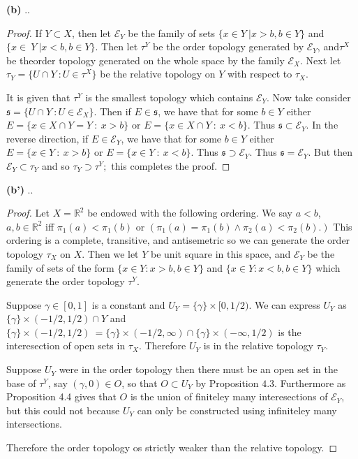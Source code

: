 \documentclass[11pt]{amsart}
\theoremstyle{definition}
\numberwithin{theorem}{section}
\numberwithin{definition}{section}
\numberwithin{equation}{section}
\def\reals{{\mathbb R}}
\def\scripte{{\mathcal E}}
\begin{document}
\noindent \textbf{(b)} ..
\begin{proof}
	If $Y \subset X$, then let $\scripte_Y$ be the family of sets $\{x \in Y\ | x > b, b \in Y\}$ and $\{x \in\ Y\ | x < b, b \in Y\}$. Then let $\tau^Y$ be the order topology generated by $\scripte_Y$, and$\tau^X$ be theorder topology generated on the whole space by the family $\scripte_X$.  Next let $\tau_Y = \{U \cap Y\ : U \in \tau^X\}$
	be the relative topology on $Y$ with respect to $\tau_X.$

	It is given that $\tau^Y$ is the smallest topology which contains $\scripte_Y$. Now take consider $\mathfrak{s} = \{U \cap Y\ : U \in \scripte_X\}.$ Then if $E \in \mathfrak{s}$, we have that for some $b \in Y$ either
	$E = \{x \in X \cap Y = Y\ :\ x > b\}$ or $E = \{x \in X \cap Y\ :\ x < b\}$. Thus $\mathfrak{s} \subset \scripte_Y$. In the reverse direction, if $E \in \scripte_Y$, we have that for some $b \in Y$ either
	$E = \{x \in Y\ :\ x > b\}$ or $E = \{x \in Y\ :\ x < b\}$. Thus $\mathfrak{s} \supset \scripte_Y$. Thus $\mathfrak{s} = \scripte_Y.$ But then $\scripte_Y \subset \tau_Y$ and so $\tau_Y \supset \tau^Y;$ this completes the proof.
\end{proof}
\noindent \textbf{(b')} ..
\begin{proof}
	Let $X =\reals^2$ be endowed with the following ordering. We say $a < b$, $a,b \in \reals^2$ iff
	$\pi_1(a) < \pi_1(b)$ or $(\pi_1(a) =\pi_1(b) \wedge \pi_2(a) < \pi_2(b).)$ This ordering is a complete, transitive, and antisemetric so
	we can generate the order topology $\tau_X$ on $X$. Then we let $Y$ be unit square in this space, and $\scripte_Y$ be the family of sets of the form $\{x \in Y:x >b, b \in Y\}$ and $\{x \in Y: x < b, b \in Y\}$ which generate the order topology $\tau^Y.$

	Suppose $\gamma \in [0,1]$ is a constant and $U_Y = \{\gamma\} \times [0, 1/2).$ We can express $U_Y$ as $\{\gamma\} \times (-1/2, 1/2) \cap Y$ and $\{\gamma\} \times (-1/2, 1/2) \ = \{\gamma\} \times (-1/2, \infty) \cap \{\gamma\} \times (-\infty, 1/2)$ is the interesection of open sets in $\tau_X.$ Therefore $U_Y$ is in the relative topology $\tau_Y$. 

	Suppose $U_Y$ were in the order topology
	then there must be an open set in the base of $\tau^Y$, say $(\gamma, 0) \in O$, so that $O \subset U_Y$ by Proposition $4.3$. Furthermore
	as Proposition 4.4 gives that $O$ is the union of finiteley many interesections of $\scripte_Y$,
	but this could not because $U_Y$ can only be constructed using infiniteley many intersections.

	Therefore the order topology os strictly weaker than the relative topology.

\end{proof}
\end{document}
